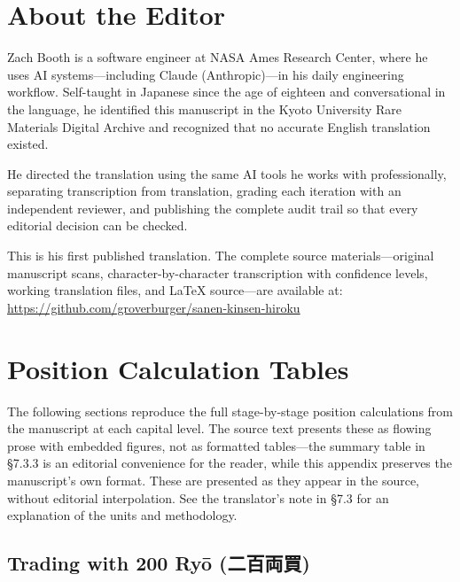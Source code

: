 \documentclass[10pt, openany]{book}
\newcommand{\jp}[1]{{\japanesefont #1}}
\begin{document}
\chapter*{About the Editor}

Zach Booth is a software engineer at NASA Ames Research Center, where
he uses AI systems---including Claude (Anthropic)---in his daily
engineering workflow. Self-taught in Japanese since the age of eighteen
and conversational in the language, he identified this manuscript in
the Kyoto University Rare Materials Digital Archive and recognized that
no accurate English translation existed.

He directed the translation using the same AI tools he works with
professionally, separating transcription from translation, grading each
iteration with an independent reviewer, and publishing the complete
audit trail so that every editorial decision can be checked.

This is his first published translation. The complete source
materials---original manuscript scans, character-by-character
transcription with confidence levels, working translation files, and
\LaTeX{} source---are available at:\\
\url{https://github.com/groverburger/sanen-kinsen-hiroku}

\appendix
\chapter{Position Calculation Tables}
\label{app:calctables}

The following sections reproduce the full stage-by-stage position
calculations from the manuscript at each capital level. The source text
presents these as flowing prose with embedded figures, not as formatted
tables---the summary table in \S 7.3.3 is an editorial convenience for
the reader, while this appendix preserves the manuscript's own format.
These are presented as they appear in the source, without editorial
interpolation. See the translator's note in \S 7.3 for an explanation
of the units and methodology.

\section{Trading with 200 Ry\=o (\jp{二百両買})}
\end{document}
